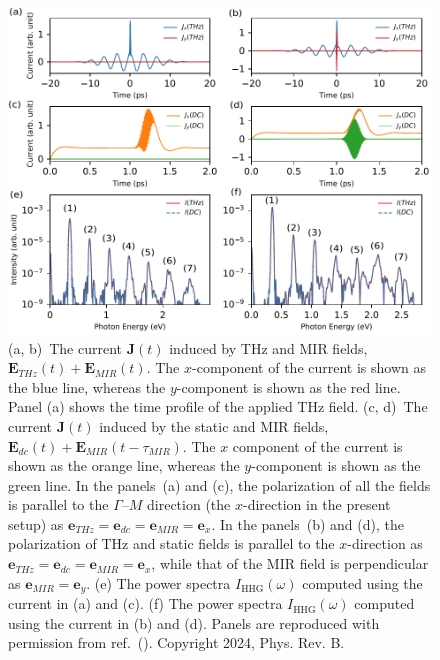 \begin{figure}[ht]
	\includegraphics[width=0.9\linewidth]{pic/fig1.pdf}
	\caption{\label{fig:current}
		(a, b)~The current $\mathbf{J} (t)$ induced by THz and MIR fields, $\mathbf E_{THz}(t)+\mathbf E_{MIR}(t)$. The $x$-component of the current is shown as the blue line, whereas the $y$-component is shown as the red line. Panel (a) shows the time profile of the applied THz field. (c, d)~The current $\mathbf{J}(t)$ induced by the static and MIR fields, $\mathbf E_{dc}(t)+\mathbf E_{MIR}(t-\tau_{MIR})$. The $x$ component of the current is shown as the orange line, whereas the $y$-component is shown as the green line. In the panels~(a) and (c), the polarization of all the fields is parallel to the $\Gamma$--$M$ direction (the $x$-direction in the present setup) as $\mathbf e_{THz}=\mathbf e_{dc}=\mathbf e_{MIR}=\mathbf e_x$. In the panels~(b) and (d), the polarization of THz and static fields is parallel to the $x$-direction as $\mathbf e_{THz}=\mathbf e_{dc}=\mathbf e_{MIR}=\mathbf e_x$, while that of the MIR field is perpendicular as $\mathbf e_{MIR}=\mathbf e_y$. (e) The power spectra $I_{\mathrm{HHG}}(\omega)$ computed using the current in (a) and (c). (f) The power spectra $I_{\mathrm{HHG}}(\omega)$ computed using the current in (b) and (d). Panels are reproduced with permission from ref.~(\cite{PhysRevB.109.045421}). Copyright 2024, Phys. Rev. B.
	}
\end{figure}

